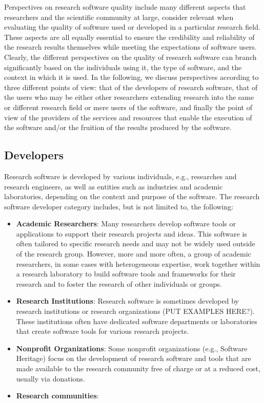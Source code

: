 Perspectives on research software quality include many different aspects that researchers and the scientific community at large, consider relevant when evaluating the quality of software used or developed in a particular research field. These aspects are all equally essential to ensure the credibility and reliability of the research results themselves while meeting the expectations of software users. Clearly, the different perspectives on the quality of research software can branch significantly based on the individuals using it, the type of software, and the context in which it is used. 
In the following, we discuss perspectives according to three different points of view: that of the developers of research software, that of the users who may be either other researchers extending research into the same or different research field or mere users of the software, and finally the point of view of the providers of the services and resources that enable the execution of the software and/or the fruition of the results produced by the software.  

\subsection{Developers}

Research software is developed by various individuals, e.g., researches and research engineers, as well as entities such as industries and academic laboratories, depending on the context and purpose of the software. 
The research software developer category includes, but is not limited to, the following: 
\begin{itemize}
\item \textbf{Academic Researchers}: Many researchers develop software tools or applications to support their research projects and ideas. This software is often tailored to specific research needs and may not be widely used outside of the research group. However, more and more often, a group of academic researchers, in some cases with heterogeneous expertise, work together within a research laboratory to build software tools and frameworks for their research and to foster the research of other individuals or groups.
\item \textbf{Research Institutions}: Research software is sometimes developed by research institutions or research organizations (PUT EXAMPLES HERE?). These institutions often have dedicated software departments or laboratories that create software tools for various research projects.
\item \textbf{Nonprofit Organizations}: Some nonprofit organizations (e.g., Software Heritage) focus on the development of research software and tools that are made available to the research community free of charge or at a reduced cost, usually via donations.
\item \textbf{Research communities}:
\end{itemize}


